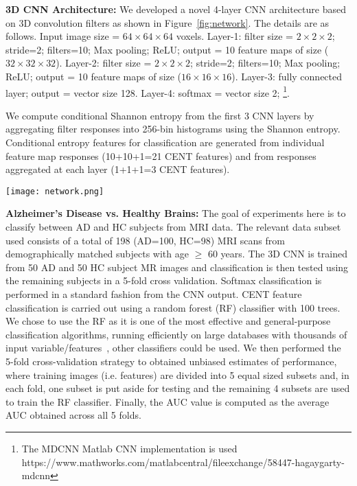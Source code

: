 \documentclass[10pt,onecolumn]{article}
\begin{document}
{\bf 3D CNN Architecture:} We developed a novel 4-layer CNN architecture based on 3D convolution filters as shown in Figure~\ref{fig:network}. The details are as follows. Input image size = $64 \times 64 \times 64$ voxels. Layer-1: filter size = $2 \times 2 \times 2$; stride=2; filters=10; Max pooling; ReLU; output = 10 feature maps of size ($32\times 32 \times 32$). Layer-2: filter size = $2 \times 2 \times 2$; stride=2; filters=10; Max pooling; ReLU; output = 10 feature maps of size ($16\times 16 \times 16$). Layer-3: fully connected layer; output = vector size 128. Layer-4: softmax = vector size 2; \footnote{The MDCNN Matlab CNN implementation is used https://www.mathworks.com/matlabcentral/fileexchange/58447-hagaygarty-mdcnn}.

We compute conditional Shannon entropy from the first 3 CNN layers by aggregating filter responses into 256-bin histograms using the Shannon entropy. Conditional entropy features for classification are generated from individual feature map responses (10+10+1=21 CENT features) and from responses aggregated at each layer (1+1+1=3 CENT features). 

\begin{figure*}[ht]
\begin{center}
\texttt{[image: network.png]}
\end{center}
   \caption{4-layer volumetric CNN architecture used in experiments, including 2 convolutional layers (with ReLU/subsampling/max pooling) followed by 1 fully connected layer and finally 1 softmax classification layer. In experiments, a) CENT features are computed from feature maps / output and passed to random forest classification, this is compared with b) standard CNN softmax output.}
\label{fig:network}
\end{figure*}

{\bf Alzheimer's Disease vs. Healthy Brains:} The goal of experiments here is to classify between AD and HC subjects from MRI data. The relevant data subset used consists of a total of 198 (AD=100, HC=98) MRI scans from demographically matched subjects with age $\geq$ 60 years. The 3D CNN is trained from 50 AD and 50 HC subject MR images and classification is then tested using the remaining subjects in a 5-fold cross validation. Softmax classification is performed in a standard fashion from the CNN output. CENT feature classification is carried out using a random forest (RF) classifier with 100 trees. We chose to use the RF as it is one of the most effective and general-purpose classification algorithms, running efficiently on large databases with thousands of input variable/features~\cite{breiman2001random}, other classifiers could be used. We then performed the 5-fold cross-validation strategy to obtained unbiased estimates of performance, where training images (i.e. features) are divided into 5 equal sized subsets and, in each fold, one subset is put aside for testing and the remaining 4 subsets are used to train the RF classifier. Finally, the AUC value is computed as the average AUC obtained across all 5 folds.
\end{document}
